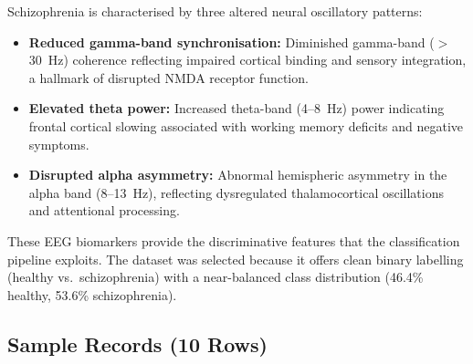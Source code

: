 Schizophrenia is characterised by three altered neural oscillatory patterns:

\begin{itemize}[leftmargin=*, itemsep=3pt]
\item \textbf{Reduced gamma-band synchronisation:} Diminished gamma-band ($>$30~Hz) coherence reflecting impaired cortical binding and sensory integration, a hallmark of disrupted NMDA receptor function.
\item \textbf{Elevated theta power:} Increased theta-band (4--8~Hz) power indicating frontal cortical slowing associated with working memory deficits and negative symptoms.
\item \textbf{Disrupted alpha asymmetry:} Abnormal hemispheric asymmetry in the alpha band (8--13~Hz), reflecting dysregulated thalamocortical oscillations and attentional processing.
\end{itemize}

\noindent These EEG biomarkers provide the discriminative features that the classification pipeline exploits. The dataset was selected because it offers clean binary labelling (healthy vs.\ schizophrenia) with a near-balanced class distribution (46.4\% healthy, 53.6\% schizophrenia).

\subsection{Sample Records (10 Rows)}

